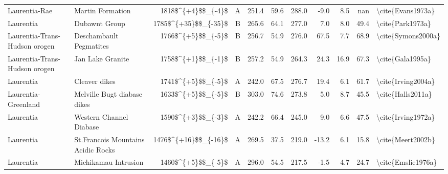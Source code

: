 \begin{longtable}{p{1 in}p{1 in}rrrrrrrr}
                 Laurentia-Rae &                                 Martin Formation &     1818\$\textasciicircum \{+4\}\$\$\_\{-4\}\$ &      A &     251.4 &      59.6 & 288.0 &  -9.0 &       8.5 &         nan &                                  \textbackslash cite\{Evans1973a\} \\
                     Laurentia &                                    Dubawnt Group &   1785\$\textasciicircum \{+35\}\$\$\_\{-35\}\$ &      B &     265.6 &      64.1 & 277.0 &   7.0 &       8.0 &        49.4 &                                   \textbackslash cite\{Park1973a\} \\
 Laurentia-Trans-Hudson orogen &                          Deschambault Pegmatites &     1766\$\textasciicircum \{+5\}\$\$\_\{-5\}\$ &      B &     256.7 &      54.9 & 276.0 &  67.5 &       7.7 &        68.9 &                                 \textbackslash cite\{Symons2000a\} \\
 Laurentia-Trans-Hudson orogen &                                 Jan Lake Granite &     1758\$\textasciicircum \{+1\}\$\$\_\{-1\}\$ &      B &     257.2 &      54.9 & 264.3 &  24.3 &      16.9 &        67.3 &                                   \textbackslash cite\{Gala1995a\} \\
                     Laurentia &                                    Cleaver dikes &     1741\$\textasciicircum \{+5\}\$\$\_\{-5\}\$ &      A &     242.0 &      67.5 & 276.7 &  19.4 &       6.1 &        61.7 &                                 \textbackslash cite\{Irving2004a\} \\
           Laurentia-Greenland &                      Melville Bugt diabase dikes &     1633\$\textasciicircum \{+5\}\$\$\_\{-5\}\$ &      B &     303.0 &      74.6 & 273.8 &   5.0 &       8.7 &        45.5 &                                  \textbackslash cite\{Halls2011a\} \\
                     Laurentia &                          Western Channel Diabase &     1590\$\textasciicircum \{+3\}\$\$\_\{-3\}\$ &      A &     242.2 &      66.4 & 245.0 &   9.0 &       6.6 &        47.5 &                                 \textbackslash cite\{Irving1972a\} \\
                     Laurentia &               St.Francois Mountains Acidic Rocks &   1476\$\textasciicircum \{+16\}\$\$\_\{-16\}\$ &      A &     269.5 &      37.5 & 219.0 & -13.2 &       6.1 &        15.8 &                                  \textbackslash cite\{Meert2002b\} \\
                     Laurentia &                             Michikamau Intrusion &     1460\$\textasciicircum \{+5\}\$\$\_\{-5\}\$ &      A &     296.0 &      54.5 & 217.5 &  -1.5 &       4.7 &        24.7 &                                 \textbackslash cite\{Emslie1976a\} \\

\end{longtable}
